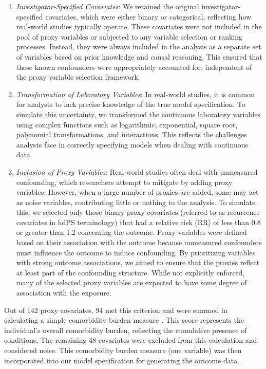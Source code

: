 \documentclass[sn-vancouver,Numbered,lineno,pdflatex]{sn-jnl}
\begin{document}
\begin{enumerate}
\def\labelenumi{\arabic{enumi}.}
\item
  \emph{Investigator-Specified Covariates}: We retained the original
  investigator-specified covariates, which were either binary or
  categorical, reflecting how real-world studies typically operate.
  These covariates were not included in the pool of proxy variables or
  subjected to any variable selection or ranking processes. Instead,
  they were always included in the analysis as a separate set of
  variables based on prior knowledge and causal reasoning. This ensured
  that these known confounders were appropriately accounted for,
  independent of the proxy variable selection framework.
\item
  \emph{Transformation of Laboratory Variables}: In real-world studies,
  it is common for analysts to lack precise knowledge of the true model
  specification. To simulate this uncertainty, we transformed the
  continuous laboratory variables using complex functions such as
  logarithmic, exponential, square root, polynomial transformations, and
  interactions. This reflects the challenges analysts face in correctly
  specifying models when dealing with continuous data.
\item
  \emph{Inclusion of Proxy Variables}: Real-world studies often deal
  with unmeasured confounding, which researchers attempt to mitigate by
  adding proxy variables. However, when a large number of proxies are
  added, some may act as noise variables, contributing little or nothing
  to the analysis. To simulate this, we selected only those binary proxy
  covariates (referred to as recurrence covariates in hdPS terminology)
  that had a relative risk (RR) of less than 0.8 or greater than 1.2
  concerning the outcome. Proxy variables were defined based on their
  association with the outcome because unmeasured confounders must
  influence the outcome to induce confounding. By prioritizing variables
  with strong outcome associations, we aimed to ensure that the proxies
  reflect at least part of the confounding structure. While not
  explicitly enforced, many of the selected proxy variables are expected
  to have some degree of association with the exposure.
\end{enumerate}

Out of 142 proxy covariates, 94 met this criterion and were summed in
calculating a simple comorbidity burden measure
\citep{farley2006comparison}. This score represents the individual's
overall comorbidity burden, reflecting the cumulative presence of
conditions. The remaining 48 covariates were excluded from this
calculation and considered noise. This comorbidity burden measure (one
variable) was then incorporated into our model specification for
generating the outcome data.
\end{document}
